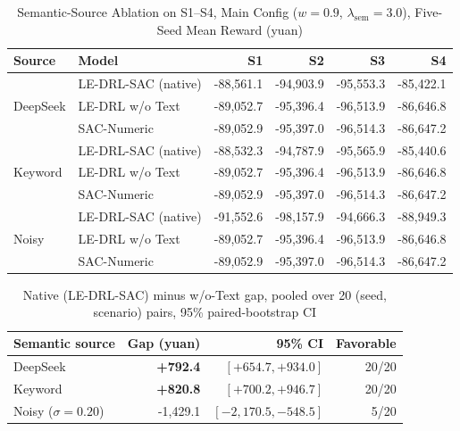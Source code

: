 \begin{table}[t!]
\caption{Semantic-Source Ablation on S1--S4, Main Config ($w=0.9$, $\lambda_{\mathrm{sem}}=3.0$), Five-Seed Mean Reward (yuan)}
\label{tab:m5_ablation}
\centering
\begin{tabular}{llrrrr}
\toprule
\textbf{Source} & \textbf{Model} & \textbf{S1} & \textbf{S2} & \textbf{S3} & \textbf{S4} \\
\midrule
\multirow{3}{*}{DeepSeek} & LE-DRL-SAC (native) & -88,561.1 & -94,903.9 & -95,553.3 & -85,422.1 \\
 & LE-DRL w/o Text & -89,052.7 & -95,396.4 & -96,513.9 & -86,646.8 \\
 & SAC-Numeric & -89,052.9 & -95,397.0 & -96,514.3 & -86,647.2 \\
\midrule
\multirow{3}{*}{Keyword} & LE-DRL-SAC (native) & -88,532.3 & -94,787.9 & -95,565.9 & -85,440.6 \\
 & LE-DRL w/o Text & -89,052.7 & -95,396.4 & -96,513.9 & -86,646.8 \\
 & SAC-Numeric & -89,052.9 & -95,397.0 & -96,514.3 & -86,647.2 \\
\midrule
\multirow{3}{*}{Noisy} & LE-DRL-SAC (native) & -91,552.6 & -98,157.9 & -94,666.3 & -88,949.3 \\
 & LE-DRL w/o Text & -89,052.7 & -95,396.4 & -96,513.9 & -86,646.8 \\
 & SAC-Numeric & -89,052.9 & -95,397.0 & -96,514.3 & -86,647.2 \\
\bottomrule
\end{tabular}
\end{table}

\begin{table}[t!]
\caption{Native (LE-DRL-SAC) minus w/o-Text gap, pooled over 20 (seed, scenario) pairs, 95\% paired-bootstrap CI}
\label{tab:m5_gaps}
\centering
\begin{tabular}{lrrr}
\toprule
\textbf{Semantic source} & \textbf{Gap (yuan)} & \textbf{95\% CI} & \textbf{Favorable} \\
\midrule
DeepSeek & \textbf{+792.4} & $[+654.7, +934.0]$ & 20/20 \\
Keyword & \textbf{+820.8} & $[+700.2, +946.7]$ & 20/20 \\
Noisy ($\sigma{=}0.20$) & -1,429.1 & $[-2{,}170.5, -548.5]$ & 5/20 \\
\bottomrule
\end{tabular}
\end{table}

